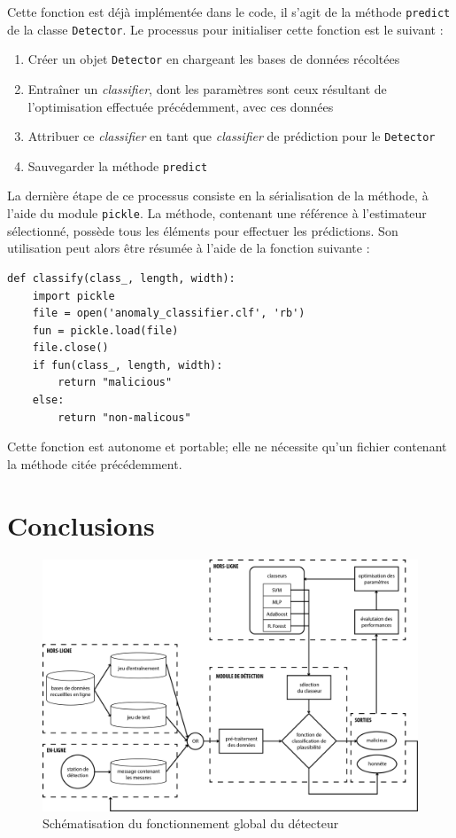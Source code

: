 \documentclass[a4paper]{report}
\begin{document}
Cette fonction est déjà implémentée dans le code, il s'agit de la méthode \texttt{predict} de la classe \texttt{Detector}. Le processus pour initialiser cette fonction est le suivant :
\begin{enumerate}
\item Créer un objet \texttt{Detector} en chargeant les bases de données récoltées
\item Entraîner un \emph{classifier}, dont les paramètres sont ceux résultant de l'optimisation effectuée précédemment, avec ces données
\item Attribuer ce \emph{classifier} en tant que \emph{classifier} de prédiction pour le \texttt{Detector}
\item Sauvegarder la méthode \texttt{predict}
\end{enumerate}
La dernière étape de ce processus consiste en la sérialisation de la méthode, à l'aide du module \texttt{pickle}. La méthode, contenant une référence à l'estimateur sélectionné, possède tous les éléments pour effectuer les prédictions. Son utilisation peut alors être résumée à l'aide de la fonction suivante :
\begin{verbatim}
def classify(class_, length, width):
    import pickle
    file = open('anomaly_classifier.clf', 'rb')
    fun = pickle.load(file)
    file.close()
    if fun(class_, length, width):
        return "malicious"
    else:
        return "non-malicous"
\end{verbatim}
Cette fonction est autonome et portable; elle ne nécessite qu'un fichier contenant la méthode citée précédemment.

\chapter{Conclusions}

\begin{figure}
\centering
\includegraphics[width=\textwidth]{img/structure.png}
\caption{Schématisation du fonctionnement global du détecteur}
\end{figure}
\end{document}
